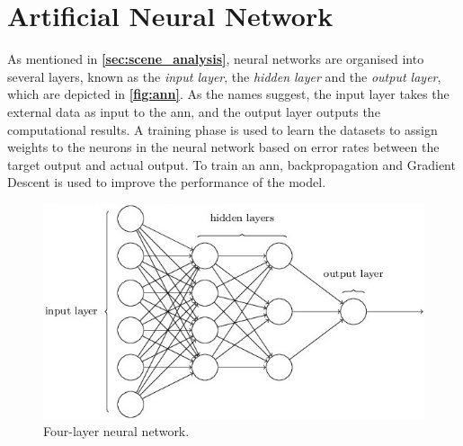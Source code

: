 \section{Artificial Neural Network} \label{neuralnetwork}  
As mentioned in \textbf{\autoref{sec:scene_analysis}}, neural networks are organised into several layers, known as the \textit{input layer}, the \textit{hidden layer} and the \textit{output layer}, which are depicted in \textbf{\autoref{fig:ann}}. As the names suggest, the input layer takes the external data as input to the \gls{ann}, and the output layer outputs the computational results. A training phase is used to learn the datasets to assign weights to the neurons in the neural network based on error rates between the target output and actual output.\cite{SAIRAMYA2019253} To train an \gls{ann}, backpropagation and Gradient Descent is used to improve the performance of the model\cite{SAIRAMYA2019253, ann}.

\begin{figure}[H]
    \centering
    \includegraphics[scale=0.75]{Images/Experiments/ann_architecture.jpg}
    \caption{Four-layer neural network\cite{ann}.}
     \label{fig:ann}
\end{figure}

